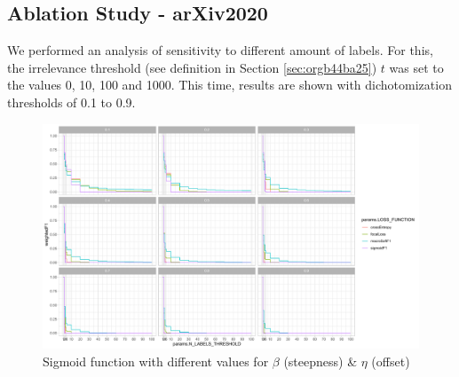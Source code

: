 
\subsection{Ablation Study - arXiv2020}

We performed an analysis of sensitivity to different amount of labels. For this, the irrelevance threshold (see definition in Section \ref{sec:orgb44ba25}) $t$ was set to the values 0, 10, 100 and 1000. This time, results are shown with dichotomization thresholds of 0.1 to 0.9. 

\begin{figure}[htbp]
\centering
\includegraphics[width=.9\linewidth]{./images/ablation.pdf}
\caption{\label{fig:ablation}
Sigmoid function with different values for $\beta$ (steepness) \& $\eta$ (offset)}
\end{figure}




